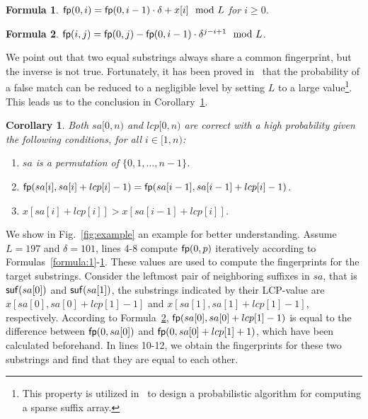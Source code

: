 \documentclass[10pt,journal,compsoc]{IEEEtran}
\newtheorem{Formula}{Formula}
\newtheorem{Corollary}{Corollary}
\begin{document}
\begin{Formula} \label{formula:2}	
	${\sf fp}(0, i) = {\sf fp}(0, i - 1) \cdot {\delta} + x[i]\mod L$ for $i \ge 0$.
	
\end{Formula}

\begin{Formula} \label{formula:3}
	${\sf fp}(i, j) = {\sf fp}(0, j) - {\sf fp}(0 ,i - 1) \cdot {\delta}^{j - i + 1}\mod L$.
	
\end{Formula}

We point out that two equal substrings always share a common fingerprint, but the inverse is not true. Fortunately, it has been proved in~\cite{Karp1987} that the probability of a false match can be reduced to a negligible level by setting $L$ to a large value\footnote{This property is utilized in~\cite{Bille2013} to design a probabilistic algorithm for computing a sparse suffix array. }. This leads us to the conclusion in Corollary~\ref{corollary:1}.

\begin{Corollary} \label{corollary:1}
	Both $sa[0, n)$ and $lcp[0, n)$ are correct with a high probability given the following conditions, for all $i \in [1, n)$:
	
	\begin{enumerate}[(1)]
		\item
		$sa$ is a permutation of $\{0, 1, \dots, n - 1\}$.
		
		\item
		${\sf fp}(sa[i], sa[i] + lcp[i] - 1) = {\sf fp}(sa[i - 1], sa[i - 1] + lcp[i] - 1)$.
		
		\item
		$x[sa[i] + lcp[i]] > x[sa[i - 1] + lcp[i]]$.
	\end{enumerate}
\end{Corollary}

We show in Fig.~\ref{fig:example} an example for better understanding. Assume $L = 197$ and $\delta = 101$, lines 4-8 compute ${\sf fp}(0, p)$ iteratively according to Formulas~\ref{formula:1}-\ref{formula:2}. These values are used to compute the fingerprints for the target substrings. Consider the leftmost pair of neighboring suffixes in $sa$, that is ${\sf suf}(sa[0])$ and ${\sf suf}(sa[1])$, the substrings indicated by their LCP-value are $x[sa[0], sa[0] + lcp[1] - 1]$ and $x[sa[1], sa[1] + lcp[1] - 1]$, respectively. According to Formula~\ref{formula:3}, ${\sf fp}(sa[0], sa[0] + lcp[1] - 1)$ is equal to the difference between ${\sf fp}(0, sa[0])$ and ${\sf fp}(0, sa[0] + lcp[1] + 1)$, which have been calculated beforehand. In lines 10-12, we obtain the fingerprints for these two substrings and find that they are equal to each other. 
\end{document}
